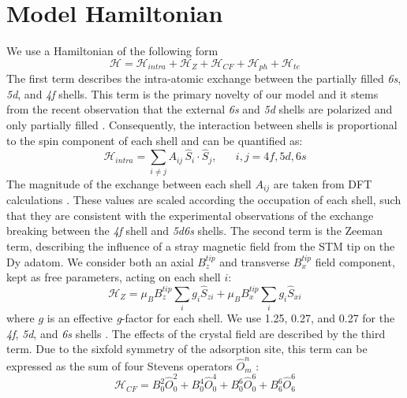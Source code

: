 \documentclass[reprint,amsmath,amssymb,aps,nofootinbib,onecolumn]{revtex4-2}
\begin{document}
\section{Model Hamiltonian}
We use a Hamiltonian of the following form
\begin{equation}
\mathcal{H} = \mathcal{H}_{intra} + \mathcal{H}_{Z} + \mathcal{H}_{CF}  + \mathcal{H}_{ph} + \mathcal{H}_{te}
\end{equation}
The first term describes the intra-atomic exchange between the partially filled \textit{6s}, \textit{5d}, and \textit{4f} shells. This term is the primary novelty of our model and it stems from the recent observation that the external \textit{6s} and \textit{5d} shells are polarized and only partially filled \cite{pivettaMeasuringIntraAtomicExchange2020}. Consequently, the interaction between shells is proportional to the spin component of each shell and can be quantified as:
\begin{equation}
\mathcal{H}_{intra} =\sum_{i\neq j} A_{ij} \, \hat{S}_{i} \cdot \hat{S}_{j} , \;\;\;\;\;\; i,j = 4f, 5d, 6s
\end{equation}
The magnitude of the exchange between each shell $A_{ij}$ are taken from DFT calculations \cite{Delin1997,pivettaMeasuringIntraAtomicExchange2020}. These values are scaled according the occupation of each shell, such that they are consistent with the experimental observations of the exchange breaking between the \textit{4f} shell and \textit{5d6s} shells. The second term is the Zeeman term, describing the influence of a stray magnetic field from the STM tip on the Dy adatom. We consider both an axial $B^{tip}_z$ and transverse $B^{tip}_x$ field component, kept as free parameters, acting on each shell $i$:
\begin{equation}
\mathcal{H}_{Z} = \mu_{B} B^{tip}_z  \sum_{i} g_{i} \hat{S}_{zi} + \mu_{B} B^{tip}_x  \sum_{i} g_{i} \hat{S}_{xi}
\label{eq:zeeman}
\end{equation}
where $g$ is an effective \textit{g}-factor for each shell. We use 1.25, 0.27, and 0.27 for the \textit{4f}, \textit{5d}, and \textit{6s} shells \cite{pivettaMeasuringIntraAtomicExchange2020}. The effects of the crystal field are described by the third term. Due to the sixfold symmetry of the adsorption site, this term can be expressed as the sum of four Stevens operators $\hat{O}^{n}_{m}$ \cite{baltic2016, Stevens_1952}:
\begin{equation}
\mathcal{H}_{CF} = B^{2}_{0} \hat{O}^{2}_{0} + B^{4}_{0} \hat{O}^{4}_{0} + B^{6}_{0} \hat{O}^{6}_{0} + B^{6}_{6} \hat{O}^{6}_{6}
\end{equation}
\end{document}
